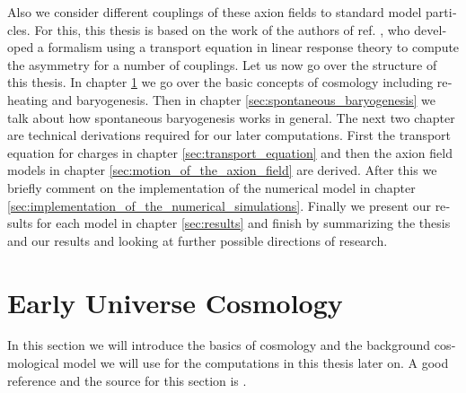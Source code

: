 \documentclass[master,       %
               twoside,        %
               BCOR10mm,       %
               english,ngerman, %
               ]{GAUBM}
\begin{document}
\begin{otherlanguage}{english}
Also we consider different couplings of these axion fields to standard model particles. For this, this thesis is based on the work of the authors of ref. \cite{Domcke:2020kcp_Generic_Couplings}, who developed a formalism using a transport equation in linear response theory to compute the asymmetry for a number of couplings.
Let us now go over the structure of this thesis.
In chapter \ref{sec:fundermentals} we go over the basic concepts of cosmology including reheating and baryogenesis.
Then in chapter \ref{sec:spontaneous_baryogenesis} we talk about how spontaneous baryogenesis works in general.
The next two chapter are technical derivations required for our later computations. First the transport equation for charges in chapter \ref{sec:transport_equation} and then the axion field models in chapter \ref{sec:motion_of_the_axion_field} are derived.
After this we briefly comment on the implementation of the numerical model in chapter \ref{sec:implementation_of_the_numerical_simulations}.
Finally we present our results for each model in chapter \ref{sec:results}
and finish by summarizing the thesis and our results and looking at further possible directions of research.

\chapter{Early Universe Cosmology}
\label{sec:fundermentals}

In this section we will introduce the basics of cosmology and the background cosmological model we will use for the computations in this thesis later on.
A good reference and the source for this section is \cite{the_early_universe_kolb_and_turner}.


\end{otherlanguage}
\end{document}
